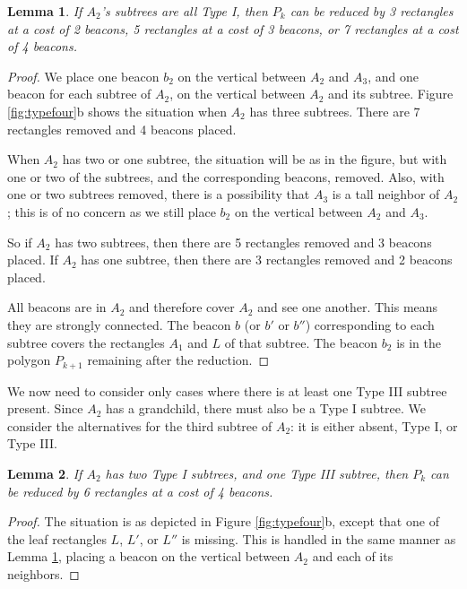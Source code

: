 \documentclass{article}
\newtheorem{lemma}{Lemma}
\begin{document}
		\begin{lemma}\label{lem:all-typeI}
		If $A_2$'s subtrees are all Type I, then $P_k$ can be reduced by 3 
			rectangles at a cost of 2 beacons, 5 rectangles at a cost of 3 beacons,
			or 7 rectangles at a cost of 4 beacons.
		\end{lemma}
		\begin{proof}
			We place one beacon $b_2$ on the vertical between $A_2$ and $A_3$,
			and one beacon for each subtree of $A_2$, on the vertical between
			$A_2$ and its subtree.  Figure \ref{fig:typefour}b shows the situation
			when $A_2$ has three subtrees. There are 7 rectangles removed
			and 4 beacons placed.
			
			When $A_2$ has two or one subtree, the situation will be as in the figure,
			but with one or two of the subtrees, and the corresponding beacons, removed.
			Also, with one or two subtrees removed, there is a possibility that $A_3$ is
			a tall neighbor of $A_2$; this is of no concern as we still place $b_2$ on the
			vertical between $A_2$ and $A_3$.
			
			So if $A_2$ has two subtrees, then there are 5
			rectangles removed and 3 beacons placed.  If $A_2$ has one subtree, then there are 3 rectangles
			removed and 2 beacons placed.
			
			All beacons are in $A_2$ and therefore cover $A_2$ and see one another.  This
			means they are strongly connected.  The beacon $b$ (or $b'$ or $b''$)
			corresponding to each subtree covers the rectangles $A_1$ and $L$ of that
			subtree.
			The beacon $b_2$ is in the polygon $P_{k+1}$ remaining after the reduction.
		\end{proof}
		
		We now need to consider only cases where there is at least one Type III
		subtree present.  Since $A_2$ has a grandchild, there must also be a Type I
		subtree.  We consider the alternatives for the third subtree of $A_2$:  it is
		either absent, Type I, or Type III.
		
		\begin{lemma}
			If $A_2$ has two Type I subtrees, and one Type III subtree, then $P_k$
			can be reduced by 6 rectangles at a cost of 4 beacons.
		\end{lemma}
		\begin{proof}
			The situation is as depicted in Figure \ref{fig:typefour}b, except that
			one of the leaf rectangles $L$, $L'$, or $L''$ is missing.
			This is handled in the same manner as Lemma \ref{lem:all-typeI},
			placing a beacon on the vertical between $A_2$ and each of its neighbors.
		\end{proof}
		
\end{document}
